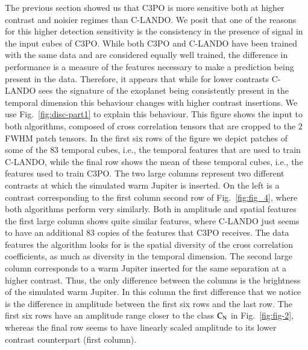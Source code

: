 \documentclass{aa}
\begin{document}
The previous section showed us that C3PO is more sensitive both at higher contrast and noisier regimes than C-LANDO.
We posit that one of the reasons for this higher detection sensitivity is the consistency in the presence of signal in the input cubes of C3PO.
While both C3PO and C-LANDO have been trained with the same data and are considered equally well trained, the difference in performance is a measure of the features necessary to make a prediction being present in the data.
Therefore, it appears that while for lower contrasts C-LANDO sees the signature of the exoplanet being consistently present in the temporal dimension this behaviour changes with higher contrast insertions.
We use Fig.~\ref{fig:disc-part1} to explain this behaviour.
This figure shows the input to both algorithms, composed of cross correlation tensors that are cropped to the $2$ FWHM patch tensors.
In the first six rows of the figure we depict patches of some of the $83$ temporal cubes, i.e., the temporal features that are used to train C-LANDO, while the final row shows the mean of these temporal cubes, i.e., the features used to train C3PO.
The two large columns represent two different contrasts at which the simulated warm Jupiter is inserted. On the left is a contrast corresponding to the first column second row of Fig.~\ref{fig:fig_4}, where both algorithms perform very similarly.
Both in amplitude and spatial features the first large column shows quite similar features, where C-LANDO just seems to have an additional $83$ copies of the features that C3PO receives. 
The data features the algorithm looks for is the spatial diversity of the cross correlation coefficients, as much as diversity in the temporal dimension.
The second large column corresponds to a warm Jupiter inserted for the same separation at a higher contrast.
Thus, the only difference between the columns is the brightness of the simulated warm Jupiter.
In this column the first difference that we notice is the difference in amplitude between the first six rows and the last row.
The first six rows have an amplitude range closer to the class $\rm{C_N}$ in Fig.~\ref{fig:fig-2}, whereas the final row seems to have linearly scaled amplitude to its lower contrast counterpart (first column).
\end{document}
